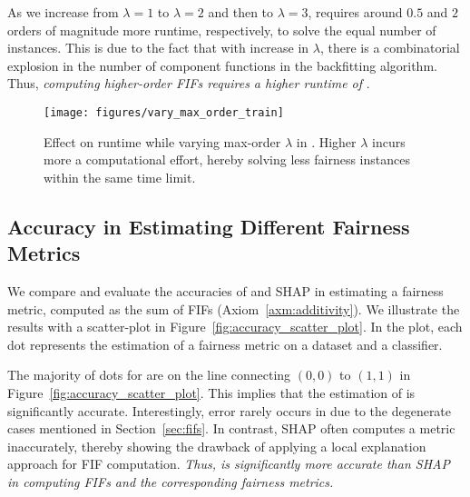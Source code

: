 As we increase from $ \lambda = 1 $ to $ \lambda = 2 $ and then to $ \lambda = 3 $, {\framework} requires around $ 0.5 $ and $ 2 $ orders of magnitude more runtime, respectively, to solve the equal number of instances. This is due to the fact that with increase in $ \lambda $, there is a combinatorial explosion in the number of component functions in the backfitting algorithm. Thus, \emph{computing higher-order FIFs requires a higher runtime of {\framework}}. 

\begin{figure}[t!]
	\centering
	{\texttt{[image: figures/vary\_max\_order\_train]}}
	\caption{Effect on runtime while varying max-order $ \lambda $ in {\framework}. Higher $ \lambda $ incurs more a computational effort, hereby solving less fairness instances within the same time limit.}\label{fig:varying_max_order}
\end{figure}


\subsection{Accuracy in Estimating Different Fairness Metrics}
We compare and evaluate the accuracies of {\framework} and SHAP in estimating a fairness metric, computed as the sum of FIFs (Axiom~\ref{axm:additivity}). We illustrate the results with a scatter-plot in Figure~\ref{fig:accuracy_scatter_plot}. In the plot, each dot represents the estimation of a fairness metric on a dataset and a classifier. 

The majority of dots for {\framework} are on the line connecting $ (0, 0) $ to $ (1, 1) $  in Figure~\ref{fig:accuracy_scatter_plot}. This implies that the estimation of {\framework} is significantly accurate. Interestingly, error rarely occurs in {\framework} due to the degenerate cases mentioned in Section~\ref{sec:fifs}. 
In contrast, SHAP often computes a metric inaccurately, thereby showing the drawback of applying a local explanation approach for FIF computation. \emph{Thus, {\framework} is significantly more accurate than SHAP in computing FIFs and the corresponding fairness metrics.}


